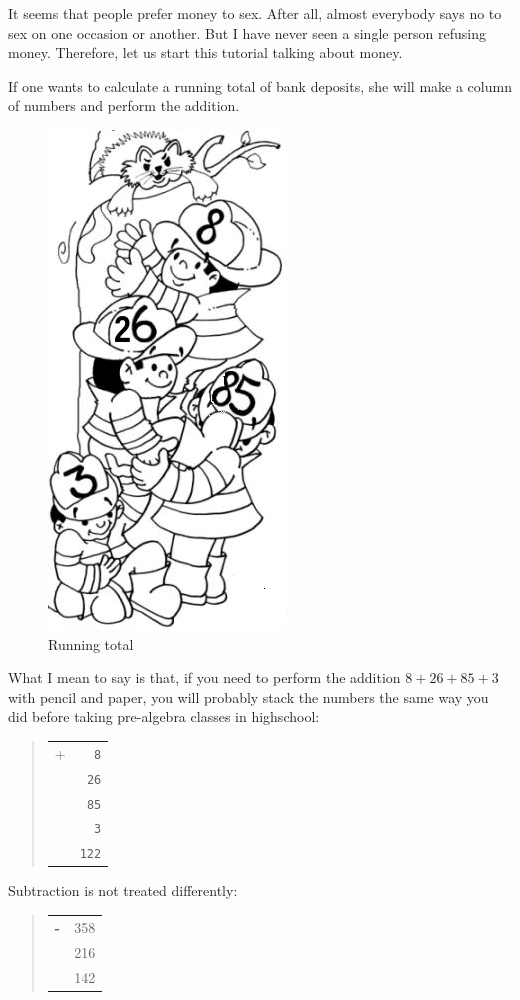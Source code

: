 \documentclass[a4paper,12pt]{book}
\begin{document}
It seems that people prefer money to sex.
After all, almost everybody says no to
sex on one occasion or another.
But I have never seen a single
person refusing money. Therefore, let us
start this tutorial talking about money.

If one wants to calculate a running
total of bank deposits, she will make
a column of numbers and perform the
addition.

\begin{figure}
\renewcommand\figurename{Fig.}
\includegraphics[scale=0.5]{figs-prefix/firemen.png}
\caption{Running total}
\end{figure}
What I mean to say is that, if you
need to perform the addition
$8 + 26 + 85 + 3$ with pencil and paper,
you will probably stack the numbers the
same way you did before taking pre-algebra
classes in highschool:
\begin{quote}
\begin{tabular}{p{0.5cm}p{1cm}}
+ &\verb|  8|\\
  &\verb| 26|\\
  &\verb| 85|\\
  &\verb|  3|\\
\hline
  &\verb|122|
\end{tabular}
\end{quote}
Subtraction is not treated differently:
\begin{quote}
\begin{tabular}{p{0.5cm}p{1.5cm}}
\Large\bf -&   358\\
&   216\\
\hline
& 142
\end{tabular}
\end{quote}
\end{document}
